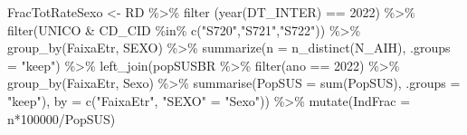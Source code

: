 \documentclass[
  letterpaper,
  DIV=11,
  numbers=noendperiod]{scrartcl}
\newenvironment{Shaded}{\begin{snugshade}}{\end{snugshade}}
\newcommand{\AttributeTok}[1]{\textcolor[rgb]{0.40,0.45,0.13}{#1}}
\newcommand{\DecValTok}[1]{\textcolor[rgb]{0.68,0.00,0.00}{#1}}
\newcommand{\FunctionTok}[1]{\textcolor[rgb]{0.28,0.35,0.67}{#1}}
\newcommand{\NormalTok}[1]{\textcolor[rgb]{0.00,0.23,0.31}{#1}}
\newcommand{\OtherTok}[1]{\textcolor[rgb]{0.00,0.23,0.31}{#1}}
\newcommand{\SpecialCharTok}[1]{\textcolor[rgb]{0.37,0.37,0.37}{#1}}
\newcommand{\StringTok}[1]{\textcolor[rgb]{0.13,0.47,0.30}{#1}}
\begin{document}
\begin{Shaded}
\begin{Highlighting}[]
\NormalTok{FracTotRateSexo }\OtherTok{\textless{}{-}}\NormalTok{ RD }\SpecialCharTok{\%\textgreater{}\%} \FunctionTok{filter}\NormalTok{ (}\FunctionTok{year}\NormalTok{(DT\_INTER) }\SpecialCharTok{==} \DecValTok{2022}\NormalTok{) }\SpecialCharTok{\%\textgreater{}\%} 
  \FunctionTok{filter}\NormalTok{(UNICO }\SpecialCharTok{\&}\NormalTok{ CD\_CID }\SpecialCharTok{\%in\%} \FunctionTok{c}\NormalTok{(}\StringTok{"S720"}\NormalTok{,}\StringTok{"S721"}\NormalTok{,}\StringTok{"S722"}\NormalTok{)) }\SpecialCharTok{\%\textgreater{}\%} 
  \FunctionTok{group\_by}\NormalTok{(FaixaEtr, SEXO) }\SpecialCharTok{\%\textgreater{}\%}
  \FunctionTok{summarize}\NormalTok{(}\AttributeTok{n =} \FunctionTok{n\_distinct}\NormalTok{(N\_AIH), }\AttributeTok{.groups =} \StringTok{"keep"}\NormalTok{) }\SpecialCharTok{\%\textgreater{}\%} 
  \FunctionTok{left\_join}\NormalTok{(popSUSBR }\SpecialCharTok{\%\textgreater{}\%} \FunctionTok{filter}\NormalTok{(ano }\SpecialCharTok{==} \DecValTok{2022}\NormalTok{) }\SpecialCharTok{\%\textgreater{}\%} \FunctionTok{group\_by}\NormalTok{(FaixaEtr, Sexo) }\SpecialCharTok{\%\textgreater{}\%} \FunctionTok{summarise}\NormalTok{(}\AttributeTok{PopSUS =} \FunctionTok{sum}\NormalTok{(PopSUS), }\AttributeTok{.groups =} \StringTok{"keep"}\NormalTok{), }\AttributeTok{by =} \FunctionTok{c}\NormalTok{(}\StringTok{"FaixaEtr"}\NormalTok{, }\StringTok{"SEXO"} \OtherTok{=} \StringTok{"Sexo"}\NormalTok{)) }\SpecialCharTok{\%\textgreater{}\%}
  \FunctionTok{mutate}\NormalTok{(}\AttributeTok{IndFrac =}\NormalTok{ n}\SpecialCharTok{*}\DecValTok{100000}\SpecialCharTok{/}\NormalTok{PopSUS)}


\end{Highlighting}
\end{Shaded}
\end{document}
